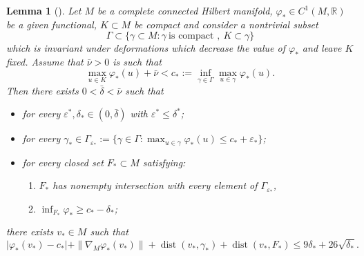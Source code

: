 \documentclass[10pt]{article}
\newcommand{\eps}{\varepsilon}
\DeclareMathOperator{\dist}{dist}
\newtheorem{lemma}[proposition]{Lemma}
\theoremstyle{definition}
\numberwithin{equation}{section}
\begin{document}
\begin{lemma}[{\cite[Thm. 4.5, Rmk. 4.10]{MR1251958}}]\label{closesequence}
Let $M$ be a complete connected Hilbert manifold, $\varphi_*\in C^{1}(M,\mathbb{R})$ be a given 
functional, $K\subset M$ be compact and consider a nontrivial subset
\[
\Gamma\subset \{\gamma\subset M:\gamma \ \text{is compact }, \ K\subset \gamma\}
\]
which is invariant under deformations which decrease the value of $\varphi_*$ and leave $K$ fixed. 
Assume that $\bar \nu>0$ is such that 
\[
\max_{u\in K}\varphi_*(u) + \bar\nu < c_*:=
\inf\limits_{\gamma\in \Gamma}\max\limits_{u\in \gamma}\varphi_*(u).
\]
Then there exists $0<\bar\delta<\bar\nu$ such that
\begin{itemize}
\item for every $\eps^*,\delta_* \in (0,\bar\delta)$ with $\eps^*\le\delta^*$;
\item for every $\gamma_*\in\Gamma_{\eps_*}:=\{\gamma\in\Gamma: \max_{u\in \gamma}\varphi_*(u)\le 
c_* + \eps_*\}$;
\item for every closed set $F_*\subset M$ satisfying:
\begin{enumerate}
\item $F_*$ has nonempty intersection with every element of $\Gamma_{\eps_*}$, 
\item $\inf_{F_*} \varphi_* \ge c_*-\delta_*$;
\end{enumerate}
\end{itemize}
there exists $v_*\in M$ such that
\[
|\varphi_*(v_*)- c_*| + \|\nabla_M \varphi_*(v_*)\|+\dist(v_*,\gamma_*)+\dist(v_*,F_*)
\le 9\delta_* + 26 \sqrt{\delta_*}.
\]
\end{lemma}
\end{document}
